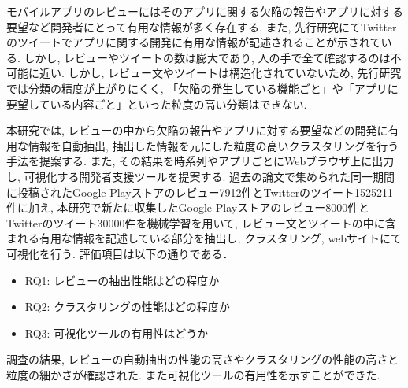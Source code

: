 
モバイルアプリのレビューにはそのアプリに関する欠陥の報告やアプリに対する要望など開発者にとって有用な情報が多く存在する. また, 先行研究にてTwitterのツイートでアプリに関する開発に有用な情報が記述されることが示されている. しかし, レビューやツイートの数は膨大であり, 人の手で全て確認するのは不可能に近い. 
しかし, レビュー文やツイートは構造化されていないため, 先行研究では分類の精度が上がりにくく, 「欠陥の発生している機能ごと」や「アプリに要望している内容ごと」といった粒度の高い分類はできない. 

本研究では, レビューの中から欠陥の報告やアプリに対する要望などの開発に有用な情報を自動抽出, 抽出した情報を元にした粒度の高いクラスタリングを行う手法を提案する. また, その結果を時系列やアプリごとにWebブラウザ上に出力し, 可視化する開発者支援ツールを提案する.
過去の論文で集められた同一期間に投稿されたGoogle Playストアのレビュー7912件とTwitterのツイート1525211件に加え, 本研究で新たに収集したGoogle Playストアのレビュー8000件とTwitterのツイート30000件を機械学習を用いて, レビュー文とツイートの中に含まれる有用な情報を記述している部分を抽出し, クラスタリング, webサイトにて可視化を行う. 評価項目は以下の通りである．
\begin{itemize}
    \item RQ1: レビューの抽出性能はどの程度か
    \item RQ2: クラスタリングの性能はどの程度か
    \item RQ3: 可視化ツールの有用性はどうか
\end{itemize}

調査の結果, レビューの自動抽出の性能の高さやクラスタリングの性能の高さと粒度の細かさが確認された. また可視化ツールの有用性を示すことができた. 
